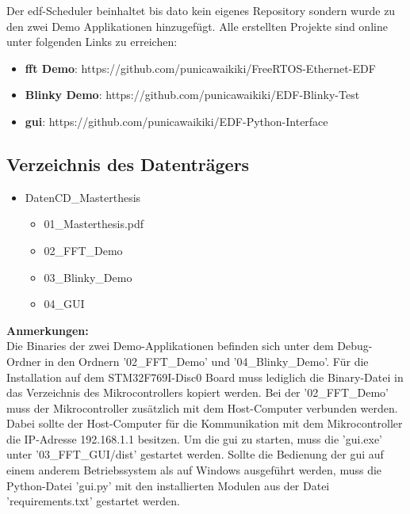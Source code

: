 \documentclass[../EDF Master Thesis.tex]{subfiles}
\begin{document}
Der \ac{edf}-Scheduler beinhaltet bis dato kein eigenes Repository sondern wurde zu den zwei Demo Applikationen hinzugefügt.
Alle erstellten Projekte sind online unter folgenden Links zu erreichen:

\begin{itemize}
    \item \textbf{\ac{fft} Demo}: https://github.com/punicawaikiki/FreeRTOS-Ethernet-EDF
    \item \textbf{Blinky Demo}: https://github.com/punicawaikiki/EDF-Blinky-Test
    \item \textbf{\ac{gui}}: https://github.com/punicawaikiki/EDF-Python-Interface
\end{itemize}

\subsection{Verzeichnis des Datenträgers}

\begin{itemize}
    \item Daten\-CD\_Masterthesis
    \begin{itemize}
        \item 01\_Masterthesis.pdf
        \item 02\_FFT\_Demo
        \item 03\_Blinky\_Demo
        \item 04\_GUI
    \end{itemize}
\end{itemize}

\textbf{Anmerkungen:}\\
Die Binaries der zwei Demo-Applikationen befinden sich unter dem Debug-Ordner in den Ordnern '02\_FFT\_Demo' und '04\_Blinky\_Demo'.
Für die Installation auf dem STM32F769I-Disc0 Board muss lediglich die Binary-Datei in das Verzeichnis des Mikrocontrollers kopiert werden.
Bei der '02\_FFT\_Demo' muss der Mikrocontroller zusätzlich mit dem Host-Computer verbunden werden.
Dabei sollte der Host-Computer für die Kommunikation mit dem Mikrocontroller die IP-Adresse 192.168.1.1 besitzen.
Um die \ac{gui} zu starten, muss die 'gui.exe' unter '03\_FFT\_GUI/dist' gestartet werden.
Sollte die Bedienung der \ac{gui} auf einem anderem Betriebssystem als auf Windows ausgeführt werden, muss die Python-Datei 'gui.py' mit den installierten Modulen aus der Datei 'requirements.txt' gestartet werden.
\end{document}
